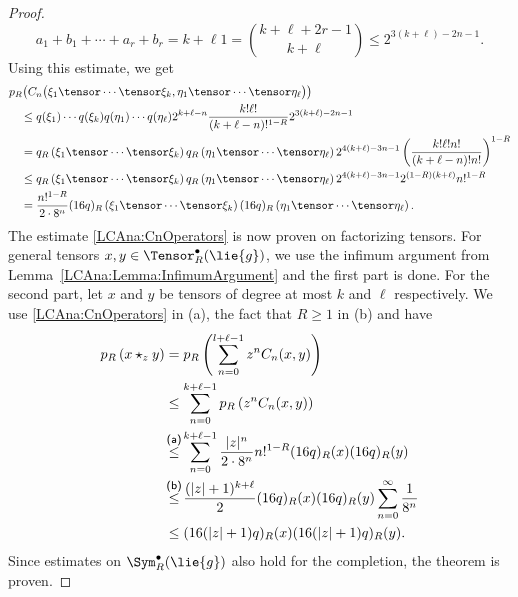 \begin{proof}
\begin{equation*}
{{            a_1 + b_1 + \cdots + a_r + b_r = k + \ell
          }}
		1
		=
		\binom{k + \ell + 2r - 1}{k + \ell}
		\leq
		2^{3(k + \ell) - 2n - 1}.
    \end{equation*}
    Using this estimate, we get
    \begin{align*}
        &p_R \big(
            C_n \big(
                \xi_1 \tensor \cdots \tensor \xi_k,
                \eta_1 \tensor \cdots \tensor \eta_{\ell}
            \big)
        \big) \\
        &\quad\leq
        q(\xi_1) \cdots q(\xi_k)
		q(\eta_1) \cdots q(\eta_{\ell})
        2^{k + \ell - n}
        \frac{k! \ell!}{(k + \ell - n)!^{1-R}}
        2^{3(k + \ell) - 2n - 1}
        \\
        &\quad=
        q_R \left(
            \xi_1 \tensor \cdots \tensor \xi_k
        \right)
        q_R \left(
            \eta_1 \tensor \cdots \tensor \eta_{\ell}
        \right)
        2^{4(k + \ell) - 3n - 1}
        \left(
        	\frac{k! \ell! n!}{(k + \ell - n)! n!}
        \right)^{1-R}
        \\
        &\quad\leq
        q_R \left(
            \xi_1 \tensor \cdots \tensor \xi_k
        \right)
        q_R \left(
            \eta_1 \tensor \cdots \tensor \eta_{\ell}
        \right)
        2^{4(k + \ell) - 3n - 1}
        2^{(1 - R)(k + \ell)}
        n!^{1 - R}
        \\
        &\quad=
        \frac{n!^{1 - R}}{2 \cdot 8^n}
        (16 q)_R \left(
            \xi_1 \tensor \cdots \tensor \xi_k
        \right)
        (16 q)_R \left(
            \eta_1 \tensor \cdots \tensor \eta_{\ell}
        \right).
    \end{align*}
    The estimate \eqref{LCAna:CnOperators} is now proven on factorizing
    tensors.
    For general tensors $x,y \in \Tensor_R^{\bullet}(\lie{g})$, we use the 
    infimum argument from Lemma~\ref{LCAna:Lemma:InfimumArgument} and the 
    first part is done. For the second part, let $x$ and $y$
    be tensors of degree at most $k$ and $\ell$ respectively. We use
    \eqref{LCAna:CnOperators} in (a), the fact that $R \geq 1$ in (b) and have
    \begin{align}
	    \nonumber
	    	p_R \left(
	    	x \star_z y
	    	\right)
	    	& =
	    	p_R \left(
	    		\sum\limits_{n=0}^{l + \ell - 1}
	    		z^n C_n(x, y)
	    	\right)
	    	\\
	    \nonumber
	    	& \leq
	    	\sum\limits_{n=0}^{k + \ell - 1}
	    	p_R \left(
	    		z^n C_n(x, y)
	    	\right)
	    	\\
	    \label{LCAna:2MonomialEstimate}
	    	& \ot{(a)}{\leq}
	    	\sum\limits_{n=0}^{k + \ell - 1}
	    	\frac{|z|^n}{2 \cdot 8^n}
	    	n!^{1 - R}
	    	(16 q)_R(x)
	    	(16 q)_R(y)
	    	\\
	    \nonumber
	    	& \ot{(b)}{\leq}
	    	\frac{(|z| + 1)^{k + \ell}}{2}
	    	(16 q)_R(x)
	    	(16 q)_R(y)
	    	\sum\limits_{n = 0}^{\infty}
	    	\frac{1}{8^n}
			\\
		\nonumber
			& \leq
	    	(16(|z| + 1) q)_R(x)
	    	(16(|z| + 1) q)_R(y).
    \end{align}
    Since estimates on $\Sym_R^{\bullet}(\lie{g})$ also hold for the
    completion, the theorem is proven.
\end{proof}
